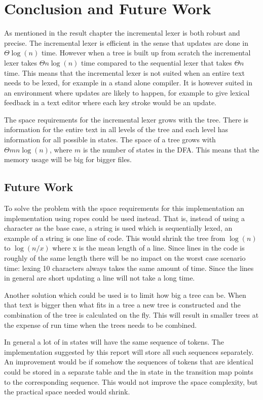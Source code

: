 \chapter{Conclusion and Future Work}
As mentioned in the result chapter the incremental lexer is both robust and
precise. The incremental lexer is efficient in the sense that updates are done
in $\Theta \log(n)$ time. However when a tree is built up from scratch the
incremental lexer takes $\Theta n\log(n)$ time compared to the sequential lexer
that takes $\Theta n$ time. This means that the incremental lexer is not suited
when an entire text needs to be lexed, for example in a stand alone compiler. It
is however suited in an environment where updates are likely to happen, for
example to give lexical feedback in a text editor where each key stroke would be
an update.

The space requirements for the incremental lexer grows with the tree. There is
information for the entire text in all levels of the tree and each level has
information for all possible in states. The space of a tree grows with
$\Theta mn\log(n)$, where $m$ is the number of states in the DFA. This means
that the memory usage will be big for bigger files.

\section{Future Work}
To solve the problem with the space requirements for this implementation an
implementation using ropes could be used instead. That is, instead of using a
character as the base case, a string is used which is sequentially lexed, an
example of a string is one line of code. This
would shrink the tree from $\log(n)$ to $\log(n/x)$ where x is the mean length
of a line. Since lines in the code is roughly of the same length there will be
no impact on the worst case scenario time: lexing 10 characters always takes the
same amount of time. Since the lines in general are short updating a line will
not take a long time.

Another solution which could be used is to limit how big a tree can be. When
that text is bigger then what fits in a tree a new tree is constructed and the
combination of the tree is calculated on the fly. This will result in smaller
trees at the expense of run time when the trees needs to be combined.

In general a lot of in states will have the same sequence of tokens. The
implementation suggested by this report will store all such sequences separately.
An improvement would be if somehow the sequences of tokens that are identical
could be stored in a separate table and the in state in the transition map points
to the corresponding sequence. This would not improve the space complexity, but
the practical space needed would shrink.
